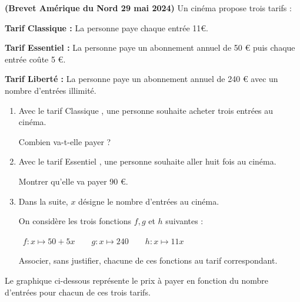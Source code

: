 \begin{act}\textbf{(Brevet Amérique du Nord 29 mai 2024)}\quad
Un cinéma propose trois tarifs :

\textbf{Tarif \og{} Classique \fg{} :} La personne paye chaque entrée 11\euro{}.

	\textbf{Tarif \og{} Essentiel \fg{} :} La personne paye un abonnement annuel de 50 \euro{} puis chaque entrée coûte 5 \euro{}.

\textbf{Tarif \og{} Liberté \fg{} :} La personne paye un abonnement annuel de 240 \euro{} avec un nombre d'entrées illimité.

\begin{enumerate}
	\item Avec le tarif \og{} Classique \fg{}, une personne souhaite acheter trois entrées au cinéma.

	Combien va-t-elle payer ?

	\item Avec le tarif \og{} Essentiel \fg{}, une personne souhaite aller huit fois au cinéma.

	Montrer qu'elle va payer 90 \euro{}.

	\item Dans la suite, $x$ désigne le nombre d'entrées au cinéma.

	On considère les trois fonctions $f, g$ et $h$ suivantes :

	\hfill~$f: x \longmapsto 50+5 x \qquad g: x \longmapsto 240 \qquad h: x \longmapsto 11 x$\hfill~

	Associer, sans justifier, chacune de ces fonctions au tarif correspondant.
\end{enumerate}

Le graphique ci-dessous représente le prix à payer en fonction du nombre d'entrées pour chacun de ces trois tarifs.

\begin{center}
\end{center}


\end{act}
